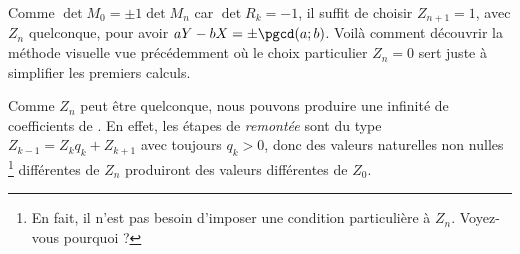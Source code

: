  
 \medskip
 
 
Comme $\det M_0 = \pm 1 \det M_n$ car $\det R_k = -1$, il suffit de choisir $Z_{n+1} = 1$, avec $Z_n$ quelconque, pour avoir $aY - bX = \pm \pgcd(a ; b)$. Voilà comment découvrir la méthode visuelle vue précédemment où le choix particulier $Z_n = 0$ sert juste à simplifier les premiers calculs.


\begin{remark}
	Comme $Z_n$ peut être quelconque, nous pouvons produire une infinité de coefficients de \bb. En effet, les étapes de \emph{\og remontée \fg} sont du type $Z_{k-1} = Z_k q_k + Z_{k+1}$ avec toujours $q_k > 0$, donc des valeurs naturelles non nulles
	\footnote{
		En fait, il n'est pas besoin d'imposer une condition particulière à $Z_n$. Voyez-vous pourquoi ?
	}
	différentes de $Z_n$ produiront des valeurs différentes de $Z_0$.
\end{remark}
